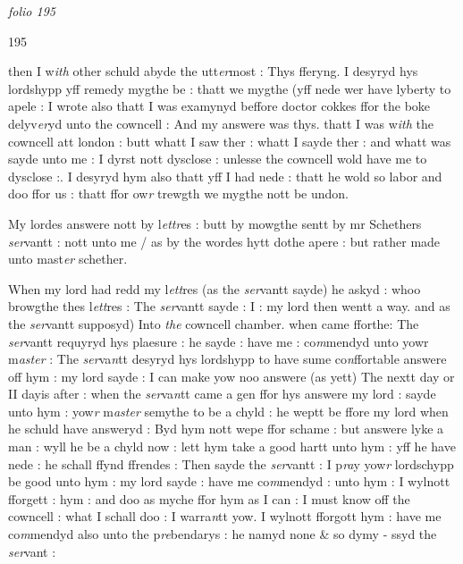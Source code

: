 \documentclass[12pt, a4paper]{book}
\begin{document}
\dotfill
						\newpage
{}

\textit{folio 195}
      				
      				
      				\begin{flushright}{\color{Mahogany}195}\end{flushright}
      				
		\ifthenelse{\isodd{\thepage}}
		{\reversemarginpar}
		{\normalmarginpar}
		then I w\textit{ith} other schuld abyde the utt\textit{er}most : Thys fferyng. I desyryd hys lordshypp yff remedy mygthe be : thatt we mygthe (yff nede wer have  lyberty to apele : I wrote also thatt I was examynyd beffore doctor cokkes ffor the boke delyv\textit{er}yd unto the cowncell : And my answere was thys. thatt I was w\textit{ith} the cowncell att london : butt whatt 
			I saw ther : whatt I sayde ther : and whatt was sayde unto me : I dyrst nott dysclose : unlesse the cowncell wold have me to dysclose :. I desyryd hym also thatt yff I had nede : thatt he wold so labor and doo ffor us : thatt ffor ow\textit{r} trewgth we mygthe nott be undon.
      				
		\ifthenelse{\isodd{\thepage}}
		{\reversemarginpar}
		{\normalmarginpar}
		My lordes answere nott by l\textit{ettr}es : butt by mowgthe sentt by mr Schethers \textit{ser}vantt : nott unto me / as by the wordes hytt dothe apere : but rather  made unto mast\textit{er} schether.
      				
		\ifthenelse{\isodd{\thepage}}
		{\reversemarginpar}
		{\normalmarginpar}
		When my lord had redd my l\textit{ett}res (as the \textit{ser}vantt sayde) he askyd : whoo browgthe thes l\textit{ett}res : The \textit{ser}vantt sayde : I : my lord then wentt a way. and as the \textit{ser}vantt supposyd) Into \textit{the} cowncell chamber. when came fforthe: The \textit{ser}vantt requyryd hys plaesure : he sayde : have me : co\textit{m}mendyd unto yowr m\textit{aster} : The \textit{ser}va\textit{n}tt desyryd hys lordshypp to have sume co\textit{n}ffortable answere off hym : my lord sayde : I can make yow noo answere (as yett) The nextt day or II dayis after : when the \textit{ser}va\textit{n}tt came a gen ffor hys answere my lord : sayde unto hym : yow\textit{r} m\textit{aster} semythe to be a chyld : he weptt be ffore my lord when he schuld have answeryd : Byd hym nott 
			wepe ffor schame : but answere lyke a man : wyll he be a chyld now : lett hym take a good hartt unto  hym : yff he have nede : he schall ffynd ffrendes :
			 Then sayde the \textit{ser}vantt : I p\textit{ra}y yow\textit{r }lordschypp be good unto hym : my lord sayde : have me co\textit{m}mendyd : unto hym : I wylnott fforgett : hym : and doo as myche ffor hym as I can :
			 I must know off the cowncell : what I schall doo : I warra\textit{n}tt yow. I wylnott fforgott hym : have me co\textit{m}mendyd also unto the p\textit{re}bendarys : he namyd none \& so dymy
			- ssyd the \textit{ser}vant : 
\end{document}
